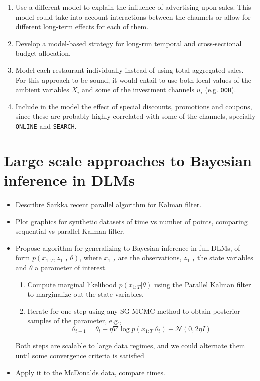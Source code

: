 \begin{enumerate}
\item Use a different model to explain the influence of advertising upon sales. This model could take into account interactions between the channels or allow for different long-term effects for each of them.
\item Develop a model-based strategy for long-run temporal and cross-sectional budget allocation.
\item Model each restaurant individually instead of using total aggregated sales. For this approach to be sound, it would entail to use both  local values of the ambient variables $X_i$ and some of the investment  channels $u_i$ (e.g. \texttt{OOH}).
\item Include in the model the effect of special discounts, promotions and coupons, since these are probably highly correlated with some of the channels, specially \texttt{ONLINE} and \texttt{SEARCH}.
\end{enumerate}

\section{Large scale approaches to Bayesian inference in DLMs}

\begin{itemize}
    \item Describre Sarkka recent parallel algorithm for Kalman filter.
    \item Plot graphics for synthetic datasets of time vs number of points, comparing sequential vs parallel Kalman filter.
    \item Propose algorithm for generalizing to Bayesian inference in full DLMs, of form $p(x_{1:T}, z_{1:T}| \theta)$, where $x_{1:T}$ are the observations, $z_{1:T}$ the state variables and $\theta$ a parameter of interest.
    \begin{enumerate}
    \item Compute marginal likelihood $p(x_{1:T}|\theta)$ using the Parallel Kalman filter to marginalize out the state variables.
    \item Iterate for one step using any SG-MCMC method to obtain posterior samples of the parameter, e.g., 
    $$
    \theta_{t+1} = \theta_t + \eta\nabla \log p(x_{1:T}|\theta_t) + \mathcal{N}(0, 2\eta I)
    $$
    \end{enumerate}
    
    Both steps are scalable to large data regimes, and we could alternate them until some convergence criteria is satisfied
    \item Apply it to the McDonalds data, compare times.
\end{itemize}